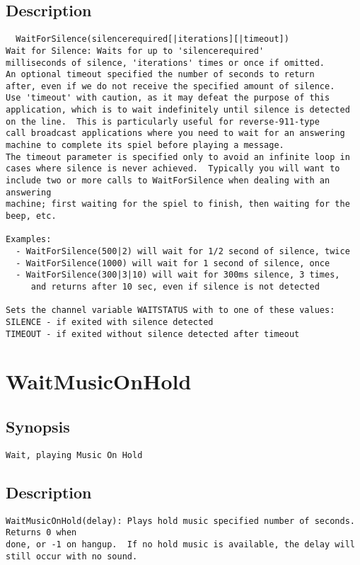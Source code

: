 \subsection{Description}
\begin{verbatim}
  WaitForSilence(silencerequired[|iterations][|timeout]) 
Wait for Silence: Waits for up to 'silencerequired' 
milliseconds of silence, 'iterations' times or once if omitted.
An optional timeout specified the number of seconds to return
after, even if we do not receive the specified amount of silence.
Use 'timeout' with caution, as it may defeat the purpose of this
application, which is to wait indefinitely until silence is detected
on the line.  This is particularly useful for reverse-911-type
call broadcast applications where you need to wait for an answering
machine to complete its spiel before playing a message.
The timeout parameter is specified only to avoid an infinite loop in
cases where silence is never achieved.  Typically you will want to
include two or more calls to WaitForSilence when dealing with an answering
machine; first waiting for the spiel to finish, then waiting for the beep, etc.

Examples:
  - WaitForSilence(500|2) will wait for 1/2 second of silence, twice
  - WaitForSilence(1000) will wait for 1 second of silence, once
  - WaitForSilence(300|3|10) will wait for 300ms silence, 3 times,
     and returns after 10 sec, even if silence is not detected

Sets the channel variable WAITSTATUS with to one of these values:
SILENCE - if exited with silence detected
TIMEOUT - if exited without silence detected after timeout

\end{verbatim}


\section{WaitMusicOnHold}
\subsection{Synopsis}
\begin{verbatim}
Wait, playing Music On Hold
\end{verbatim}
\subsection{Description}
\begin{verbatim}
WaitMusicOnHold(delay): Plays hold music specified number of seconds.  Returns 0 when
done, or -1 on hangup.  If no hold music is available, the delay will
still occur with no sound.

\end{verbatim}


